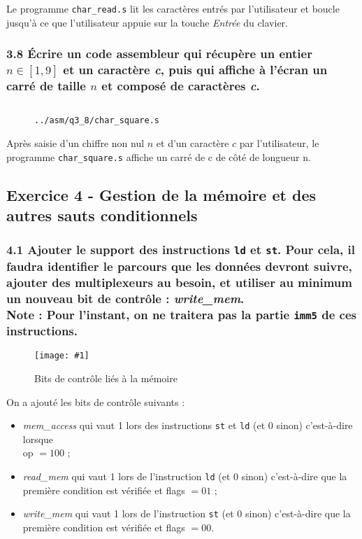 \documentclass[twoside, 12pt, a4paper]{article}
\newcommand{\cf}[3]{
    \begin{figure}[!h]
        \centering
        \texttt{[image: \#1]}
    \caption{#3}\label{Fig:#1}
    \end{figure}
}
\newcommand{\hcf}[2]{\cf{#1}{.75}{#2}}
\newcommand{\fm}[2]{
\begin{figure}[!h]
    \centering
    \inputminted[]{asm}{#1}
    \caption{\texttt{#2}}
\end{figure}
}
\begin{document}
Le programme \texttt{char\_read.s} lit les caractères entrés par l'utilisateur et boucle jusqu'à ce que l'utilisateur appuie sur la touche \textit{Entrée} du clavier.

\clearpage

        \subsubsection*{\textbf{3.8} Écrire un code assembleur qui récupère un entier $n \in [1, 9]$ et un caractère \textit{c}, puis qui affiche à l'écran un carré de taille $n$ et composé de caractères \textit{c}.}

\fm{../asm/q3_8/char_square.s}{../asm/q3\_8/char\_square.s}

Après saisie d'un chiffre non nul $n$ et d'un caractère $c$ par l'utilisateur, le programme \texttt{char\_square.s} affiche un carré de c de côté de longueur n. 
        
        \newpage

        \subsection{Exercice 4 - Gestion de la mémoire et des autres sauts conditionnels}

        \subsubsection*{\textbf{4.1} Ajouter le support des instructions \texttt{ld} et \texttt{st}. Pour cela, il faudra identifier le parcours que les données devront suivre, ajouter des multiplexeurs au besoin, et utiliser au minimum un nouveau bit de contrôle : \textit{write\_mem}.\\
        \textbf{Note : } Pour l'instant, on ne traitera pas la partie \texttt{imm5} de ces instructions.}

\hcf{ctrl_mem.png}{Bits de contrôle liés à la mémoire}

On a ajouté les bits de contrôle suivants :
\begin{itemize}
    \item \textit{mem\_access} qui vaut 1 lors des instructions \texttt{st} et \texttt{ld} (et 0 sinon) c'est-à-dire lorsque \\ op $= 100$ ;
    \item \textit{read\_mem} qui vaut 1 lors de l'instruction \texttt{ld} (et 0 sinon) c'est-à-dire que la première condition est vérifiée et flags $= 01$ ;
    \item \textit{write\_mem} qui vaut 1 lors de l'instruction \texttt{st} (et 0 sinon) c'est-à-dire que la première condition est vérifiée et flags $= 00$.
\end{itemize}
\end{document}
